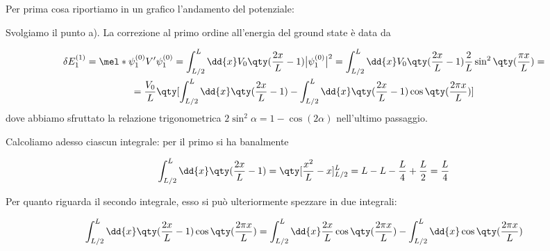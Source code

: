 \begin{soluzione}

   Per prima cosa riportiamo in un grafico l'andamento del potenziale:

   \begin{figure}[H]
      \centering
   \end{figure}
   
   Svolgiamo il punto a). La correzione al primo ordine all'energia del ground state è data da
   
   \begin{gather*}
      \delta E_1^{(1)}
      =\mel*{\psi_1^{(0)}}{V'}{\psi_1^{(0)}}
      =\int_{L/2}^{L} \dd{x} V_0 \qty( \frac{2x}{L} - 1 ) \bigl| \psi_1^{(0)} \bigr|^2
      =\int_{L/2}^{L} \dd{x} V_0 \qty( \frac{2x}{L} - 1 ) \frac{2}{L} \sin^2{ \qty( \frac{\pi x}{L} ) }=
      \\
      =\frac{V_0}{L} \qty[ \int_{L/2}^{L} \dd{x} \qty( \frac{2x}{L} - 1 ) - \int_{L/2}^{L} \dd{x} \qty( \frac{2x}{L} - 1 ) \cos{\qty( \frac{2\pi x}{L} )}]
   \end{gather*}
   dove abbiamo sfruttato la relazione trigonometrica $2 \sin^2{\alpha}=1 - \cos{(2\alpha)}$ nell'ultimo passaggio.

   Calcoliamo adesso ciascun integrale: per il primo si ha banalmente

   \begin{equation*}
      \int_{L/2}^{L} \dd{x} \qty( \frac{2x}{L} - 1 )
      =\qty[ \frac{x^2}{L} - x]_{L/2}^{L}
      =L - L - \frac{L}{4} + \frac{L}{2}
      =\frac{L}{4}
   \end{equation*}

   Per quanto riguarda il secondo integrale, esso si può ulteriormente spezzare in due integrali:

   \begin{equation*}
      \int_{L/2}^{L} \dd{x} \qty( \frac{2x}{L} - 1 ) \cos{\qty( \frac{2\pi x}{L} )}
      =\int_{L/2}^{L} \dd{x} \frac{2x}{L} \cos{\qty( \frac{2\pi x}{L} )} - \int_{L/2}^{L} \dd{x} \cos{\qty( \frac{2\pi x}{L} )}
   \end{equation*}


\end{soluzione}
